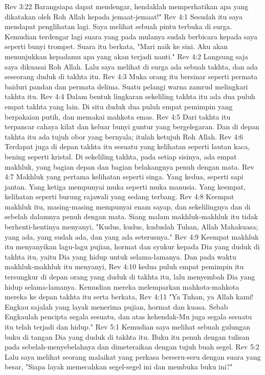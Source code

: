 Rev 3:22  Barangsiapa dapat mendengar, hendaklah memperhatikan apa yang dikatakan oleh Roh Allah kepada jemaat-jemaat!"
Rev 4:1  Sesudah itu saya mendapat penglihatan lagi. Saya melihat sebuah pintu terbuka di surga. Kemudian terdengar lagi suara yang pada mulanya sudah berbicara kepada saya seperti bunyi trompet. Suara itu berkata, "Mari naik ke sini. Aku akan menunjukkan kepadamu apa yang akan terjadi nanti."
Rev 4:2  Langsung saja saya dikuasai Roh Allah. Lalu saya melihat di surga ada sebuah takhta, dan ada seseorang duduk di takhta itu.
Rev 4:3  Muka orang itu bersinar seperti permata baiduri pandan dan permata delima. Suatu pelangi warna zamrud melingkari takhta itu.
Rev 4:4  Dalam bentuk lingkaran sekeliling takhta itu ada dua puluh empat takhta yang lain. Di situ duduk dua puluh empat pemimpin yang berpakaian putih, dan memakai mahkota emas.
Rev 4:5  Dari takhta itu terpancar cahaya kilat dan keluar bunyi guntur yang bergelegaran. Dan di depan takhta itu ada tujuh obor yang bernyala; itulah ketujuh Roh Allah.
Rev 4:6  Terdapat juga di depan takhta itu sesuatu yang kelihatan seperti lautan kaca, bening seperti kristal. Di sekeliling takhta, pada setiap sisinya, ada empat makhluk, yang bagian depan dan bagian belakangnya penuh dengan mata.
Rev 4:7  Makhluk yang pertama kelihatan seperti singa. Yang kedua, seperti sapi jantan. Yang ketiga mempunyai muka seperti muka manusia. Yang keempat, kelihatan seperti burung rajawali yang sedang terbang.
Rev 4:8  Keempat makhluk itu, masing-masing mempunyai enam sayap, dan sekelilingnya dan di sebelah dalamnya penuh dengan mata. Siang malam makhluk-makhluk itu tidak berhenti-hentinya menyanyi, "Kudus, kudus, kuduslah Tuhan, Allah Mahakuasa; yang ada, yang sudah ada, dan yang ada seterusnya."
Rev 4:9  Keempat makhluk itu menyanyikan lagu-lagu pujian, hormat dan syukur kepada Dia yang duduk di takhta itu, yaitu Dia yang hidup untuk selama-lamanya. Dan pada waktu makhluk-makhluk itu menyanyi,
Rev 4:10  kedua puluh empat pemimpin itu tersungkur di depan orang yang duduk di takhta itu, lalu menyembah Dia yang hidup selama-lamanya. Kemudian mereka melemparkan mahkota-mahkota mereka ke depan takhta itu serta berkata,
Rev 4:11  "Ya Tuhan, ya Allah kami! Engkau sajalah yang layak menerima pujian, hormat dan kuasa. Sebab Engkaulah pencipta segala sesuatu, dan atas kehendak-Mu juga segala sesuatu itu telah terjadi dan hidup."
Rev 5:1  Kemudian saya melihat sebuah gulungan buku di tangan Dia yang duduk di takhta itu. Buku itu penuh dengan tulisan pada sebelah-menyebelahnya dan dimeteraikan dengan tujuh buah segel.
Rev 5:2  Lalu saya melihat seorang malaikat yang perkasa berseru-seru dengan suara yang besar, "Siapa layak memecahkan segel-segel ini dan membuka buku ini?"

